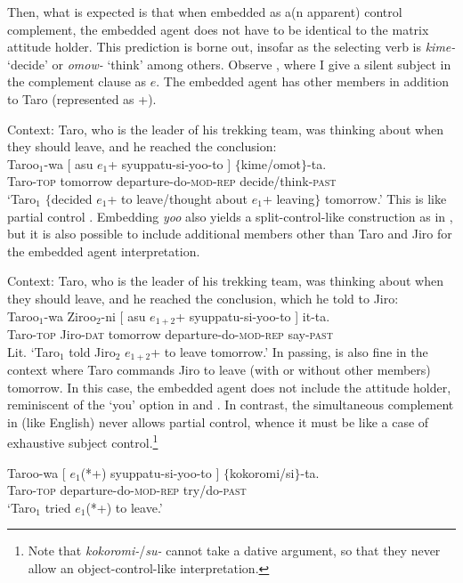 \documentclass[output=paper]{langsci/langscibook}
\begin{document}
Then, what is expected is that when embedded as a(n apparent) control complement, the embedded agent does not have to be identical to the matrix attitude holder. This prediction is borne out, insofar as the selecting verb is \textit{kime-} `decide' or \textit{omow-} `think' among others. Observe , where I give a silent subject in the complement clause as $e$. The embedded agent has other members in addition to Taro (represented as +).

\ea\label{shimamu9} Context: Taro, who is the leader of his trekking team, was thinking about when they should leave, and he reached the conclusion:\\
\gll Taroo$_1$-wa [ asu $e_1$+ syuppatu-si-yoo-to ] $\{$kime/omot$\}$-ta.\\
Taro-\textsc{top} {} tomorrow {} departure-do-\textsc{mod-rep} {} \phantom{$\{$}decide/think-\textsc{past}\\
\glt `Taro$_1$ $\{$decided $e_1$+ to leave/thought about $e_1$+ leaving$\}$ tomorrow.'
\z
This is like partial control \citep[cf.][]{landau2000}. Embedding \textit{yoo} also yields a split-control-like construction as in , but it is also possible to include additional members other than Taro and Jiro for the embedded agent interpretation.

\ea\label{shimamu10} Context: Taro, who is the leader of his trekking team, was thinking about when they should leave, and he reached the conclusion, which he told to Jiro:\\
\gll Taroo$_1$-wa Ziroo$_2$-ni [ asu $e_{1+2}$+ syuppatu-si-yoo-to ] it-ta.\\
Taro-\textsc{top} Jiro-\textsc{dat} {} tomorrow {} departure-do-\textsc{mod-rep} {} say-\textsc{past}\\
\glt Lit. `Taro$_1$ told Jiro$_2$ $e_{1+2}$+ to leave tomorrow.'
\z
In passing,  is also fine in the context where Taro commands Jiro to leave (with or without other members) tomorrow. In this case, the embedded agent does not include the attitude holder, reminiscent of the `you' option in  and . In contrast, the simultaneous complement in  (like English) never allows partial control, whence it must be like a case of exhaustive subject control.\footnote{Note that \textit{kokoromi-}/\textit{su-} cannot take a dative argument, so that they never allow an object-control-like interpretation.}

\ea\label{shimamu11} \gll Taroo-wa [  $e_1$(*+) syuppatu-si-yoo-to ] $\{$kokoromi/si$\}$-ta.\\
Taro-\textsc{top} {} {} departure-do-\textsc{mod-rep} {} \phantom{$\{$}try/do-\textsc{past}\\
\glt `Taro$_1$ tried $e_1$(*+) to leave.'
\z
\end{document}

